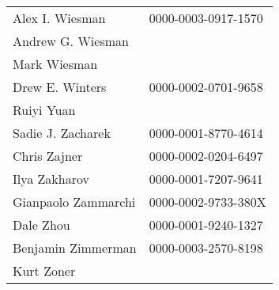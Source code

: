 \begin{longtable}{ll}
           Alex I. Wiesman & 0000-0003-0917-1570 \\
         Andrew G. Wiesman &                     \\
              Mark Wiesman &                     \\
           Drew E. Winters & 0000-0002-0701-9658 \\
                Ruiyi Yuan &                     \\
         Sadie J. Zacharek & 0000-0001-8770-4614 \\
              Chris Zajner & 0000-0002-0204-6497 \\
             Ilya Zakharov & 0000-0001-7207-9641 \\
       Gianpaolo Zammarchi & 0000-0002-9733-380X \\
                 Dale Zhou & 0000-0001-9240-1327 \\
        Benjamin Zimmerman & 0000-0003-2570-8198 \\
                Kurt Zoner &                     \\
\end{longtable}
